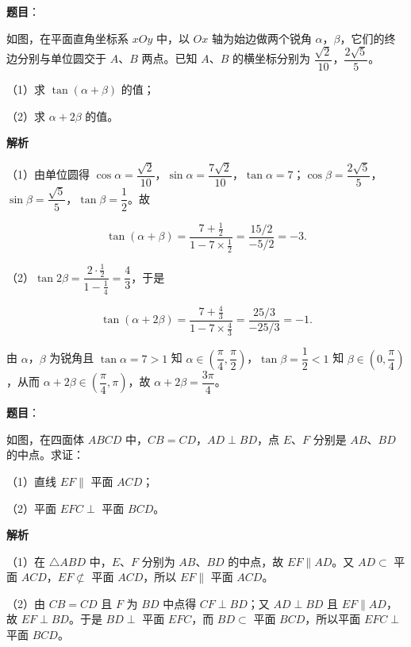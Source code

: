 \begin{answer}

\textbf{题目}：

如图，在平面直角坐标系 $xOy$ 中，以 $Ox$ 轴为始边做两个锐角 $\alpha$，$\beta$，它们的终边分别与单位圆交于 $A$、$B$ 两点。已知 $A$、$B$ 的横坐标分别为 $\dfrac{\sqrt2}{10}$，$\dfrac{2\sqrt5}5$。

（1）求 $\tan(\alpha+\beta)$ 的值；

（2）求 $\alpha+2\beta$ 的值。
\nopagebreak[4]
\begin{center}\end{center}
\nopagebreak[4]
\textbf{解析}

（1）由单位圆得 $\cos\alpha=\dfrac{\sqrt2}{10}$，$\sin\alpha=\dfrac{7\sqrt2}{10}$，$\tan\alpha=7$；$\cos\beta=\dfrac{2\sqrt5}5$，$\sin\beta=\dfrac{\sqrt5}5$，$\tan\beta=\dfrac12$。故

\nopagebreak[4]
\[\tan(\alpha+\beta)=\frac{7+\frac12}{1-7\times\frac12}=\frac{15/2}{-5/2}=-3.\]

（2）$\tan2\beta=\dfrac{2\cdot\frac12}{1-\frac14}=\dfrac43$，于是

\nopagebreak[4]
\[\tan(\alpha+2\beta)=\frac{7+\frac43}{1-7\times\frac43}=\frac{25/3}{-25/3}=-1.\]

由 $\alpha$，$\beta$ 为锐角且 $\tan\alpha=7>1$ 知 $\alpha\in\left(\dfrac{\pi}4,\dfrac{\pi}2\right)$，$\tan\beta=\dfrac12<1$ 知 $\beta\in\left(0,\dfrac{\pi}4\right)$，从而 $\alpha+2\beta\in\left(\dfrac{\pi}4,\pi\right)$，故 $\alpha+2\beta=\dfrac{3\pi}4$。


\end{answer}
\begin{answer}

\textbf{题目}：

如图，在四面体 $ABCD$ 中，$CB=CD$，$AD\perp BD$，点 $E$、$F$ 分别是 $AB$、$BD$ 的中点。求证：

（1）直线 $EF\parallel$ 平面 $ACD$；

（2）平面 $EFC\perp$ 平面 $BCD$。
\nopagebreak[4]
\begin{center}\end{center}
\nopagebreak[4]
\textbf{解析}

（1）在 $\triangle ABD$ 中，$E$、$F$ 分别为 $AB$、$BD$ 的中点，故 $EF\parallel AD$。又 $AD\subset$ 平面 $ACD$，$EF\not\subset$ 平面 $ACD$，所以 $EF\parallel$ 平面 $ACD$。

（2）由 $CB=CD$ 且 $F$ 为 $BD$ 中点得 $CF\perp BD$；又 $AD\perp BD$ 且 $EF\parallel AD$，故 $EF\perp BD$。于是 $BD\perp$ 平面 $EFC$，而 $BD\subset$ 平面 $BCD$，所以平面 $EFC\perp$ 平面 $BCD$。


\end{answer}
